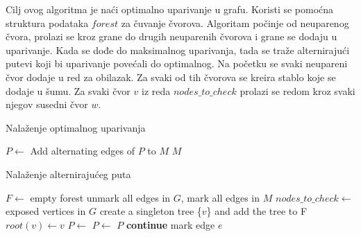 \documentclass[11pt,a4paper]{article}
\theoremstyle{definition}
\begin{document}
Cilj ovog algoritma je naći optimalno uparivanje u grafu. Koristi se pomoćna struktura podataka $forest$ za čuvanje čvorova. Algoritam počinje od neuparenog čvora, prolazi se kroz grane do drugih neuparenih čvorova i grane se dodaju u uparivanje. Kada se dođe do maksimalnog uparivanja, tada se traže alternirajući putevi koji bi uparivanje povećali do optimalnog. Na početku se svaki neupareni čvor dodaje u red za obilazak. Za svaki od tih čvorova se kreira stablo koje se dodaje u šumu. Za svaki čvor $v$ iz reda $nodes\_to\_check$ prolazi se redom kroz svaki njegov susedni čvor $w$.

\begin{algorithm}[H]
\caption{Nalaženje optimalnog uparivanja}
\begin{algorithmic}
    \State $P \gets$ 
        \State Add alternating edges of $P$ to $M$
        \State \Return {}
    \Else
        \State \Return $M$
    \EndIf
\EndFunction

\end{algorithmic}
\end{algorithm}

\begin{algorithm}[H]
\caption{Nalaženje alternirajućeg puta}
\begin{algorithmic}

    \State $F \gets$ empty forest
    \State unmark all edges in $G$, mark all edges in $M$
    \State $nodes\_to\_check \gets$ exposed vertices in $G$
        \State create a singleton tree \{$v$\} and add the tree to F
        \State $root(v) \gets v$
    \EndFor
             
                \State {}
            \Else
                        \State $P \gets$ 
                    \Else
                        \State $P \gets$ 
                        \State \Return $P$
                    \EndIf
                \Else
                    \State \textbf{continue}
                \EndIf
            \EndIf
            \State mark edge $e$
            \EndWhile
    \EndFor
    \State \Return []
\EndFunction
\end{algorithmic}
\end{algorithm}
\end{document}
